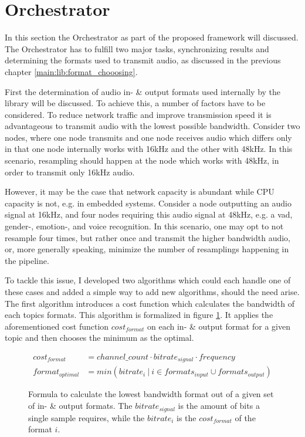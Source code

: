 


\section{Orchestrator}
\label{main:orc}
In this section the Orchestrator as part of the proposed framework will discussed.
The Orchestrator has to fulfill two major tasks, synchronizing results and determining the formats used to transmit audio, as discussed in the previous chapter \ref{main:lib:format_chooosing}.

First the determination of audio in- \& output formats used internally by the library will be discussed.
To achieve this, a number of factors have to be considered.
To reduce network traffic and improve transmission speed it is advantageous to transmit audio with the lowest possible bandwidth.
Consider two nodes, where one node transmits and one node receives audio which differs only in that one node internally works with 16kHz and the other with 48kHz.
In this scenario, resampling should happen at the node which works with 48kHz, in order to transmit only 16kHz audio.

However, it may be the case that network capacity is abundant while CPU capacity is not, e.g. in embedded systems.
Consider a node outputting an audio signal at 16kHz, and four nodes requiring this audio signal at 48kHz, e.g. a \gls{vad}, gender-, emotion-, and voice recognition.
In this scenario, one may opt to not resample four times, but rather once and transmit the higher bandwidth audio, or, more generally speaking, minimize the number of resamplings happening in the pipeline.

To tackle this issue, I developed two algorithms which could each handle one of these cases and added a simple way to add new algorithms, should the need arise.
The first algorithm introduces a cost function which calculates the bandwidth of each topics formats.
This algorithm is formalized in figure \ref{main:orc:resampling:formula:min_traffic}.
It applies the aforementioned cost function $cost_{format}$ on each in- \& output format for a given topic and then chooses the minimum as the optimal.

\begin{figure}
	\begin{align*}
	cost_{format} &= channel\_count \cdot bitrate_{signal} \cdot frequency\\
	format_{optimal} &= min({bitrate_{i}\ |\ i \in formats_{input} \cup formats_{output}})
	\end{align*}
	\caption{Formula to calculate the lowest bandwidth format out of a given set of in- \& output formats.
		The $bitrate_{signal}$ is the amount of bits a single sample requires, while the $bitrate_{i}$ is the $cost_{format}$ of the format $i$.}
	\label{main:orc:resampling:formula:min_traffic}
\end{figure}

